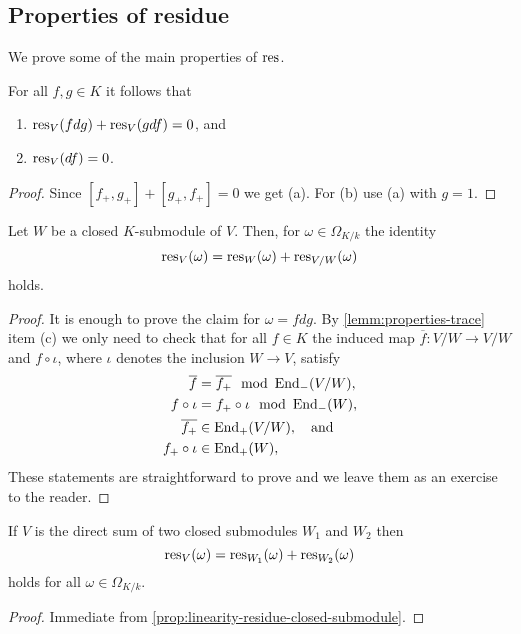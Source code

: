 \subsection{Properties of residue}
We prove some of the main properties of $\operatorname{res}$.
\begin{proposition}\label{prop:linearity-residue}
	For all $f,g \in K$ it follows that
	\begin{enumerate}[label = (\alph*)]
		\item $\operatorname{res}_{V}(fdg) + \operatorname{res}_{V}(gdf) = 0$, and
		\item $\operatorname{res}_V(df) = 0$.
	\end{enumerate}
\end{proposition}
\begin{proof}
	Since $[f_{+}, g_{+}] + [g_{+}, f_{+}] = 0$ we get (a). For (b) use (a) with $g = 1$. 
\end{proof}
\begin{proposition}\label{prop:linearity-residue-closed-submodule}
	Let $W$ be a closed $K$-submodule of $V$. Then, for $\omega \in \Omega_{K/k}$ the identity
	\[
		\operatorname{res}_{V}(\omega) = \operatorname{res}_{W}(\omega) + \operatorname{res}_{V/W}(\omega)
	\]
	holds.
\end{proposition}
\begin{proof}
	It is enough to prove the claim for $\omega = f dg$. By \cref{lemm:properties-trace} item (c) we only need to check that for all $f \in K$ the induced map $\overline{f}\colon V/W \to V/W$ and $f \circ \iota$, where $\iota$ denotes the inclusion $W \to V$, satisfy
	\begin{align*}
	\overline{f} &= \overline{f_{+}} \mod {\operatorname{End}}_{-}(V/W), \\
	f \circ \iota &= f_{+} \circ \iota \mod {\operatorname{End}}_{-}(W), \\ 
	\overline{f_{+}}&\in \operatorname{End}_{+}(V/W), \quad\text{and} \\
	f_{+} \circ \iota &\in \operatorname{End}_{+}(W),
	\end{align*}
	These statements are straightforward to prove and we leave them as an exercise to the reader.
\end{proof}
\begin{proposition}\label{prop:direct-sum-residue}
	If $V$ is the direct sum of two closed submodules $W_{1}$ and $W_{2}$ then 
	\[
		\operatorname{res}_{V}(\omega) = \operatorname{res}_{W_{1}}(\omega) + \operatorname{res}_{W_{2}}(\omega)
	\]
	holds for all $\omega \in \Omega_{K/k}$.
\end{proposition}
\begin{proof}
	Immediate from \cref{prop:linearity-residue-closed-submodule}.
\end{proof}
